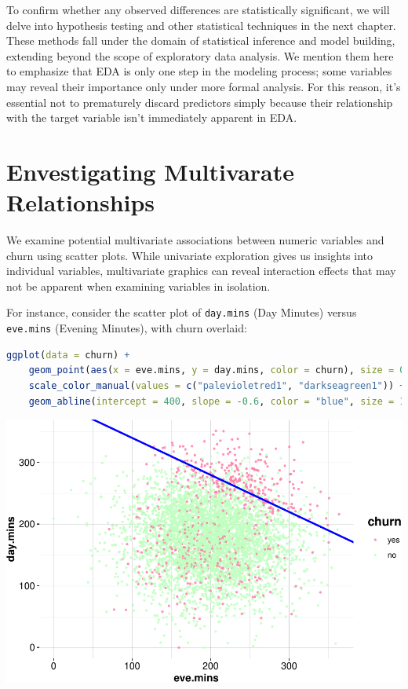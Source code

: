 \documentclass[
]{book}
\newcommand{\passthrough}[1]{#1}
\theoremstyle{definition}
\theoremstyle{definition}
\theoremstyle{definition}
\theoremstyle{definition}
\theoremstyle{remark}
\begin{document}
To confirm whether any observed differences are statistically significant, we will delve into hypothesis testing and other statistical techniques in the next chapter. These methods fall under the domain of statistical inference and model building, extending beyond the scope of exploratory data analysis. We mention them here to emphasize that EDA is only one step in the modeling process; some variables may reveal their importance only under more formal analysis. For this reason, it's essential not to prematurely discard predictors simply because their relationship with the target variable isn't immediately apparent in EDA.

\section{Envestigating Multivarate Relationships}\label{envestigating-multivarate-relationships}

We examine potential multivariate associations between numeric variables and churn using scatter plots. While univariate exploration gives us insights into individual variables, multivariate graphics can reveal interaction effects that may not be apparent when examining variables in isolation.

For instance, consider the scatter plot of \passthrough{\lstinline!day.mins!} (Day Minutes) versus \passthrough{\lstinline!eve.mins!} (Evening Minutes), with churn overlaid:

\begin{lstlisting}[language=R]
ggplot(data = churn) +
    geom_point(aes(x = eve.mins, y = day.mins, color = churn), size = 0.7, alpha = 0.8) +
    scale_color_manual(values = c("palevioletred1", "darkseagreen1")) +
    geom_abline(intercept = 400, slope = -0.6, color = "blue", size = 1)
\end{lstlisting}

\begin{center}\includegraphics{EDA_files/figure-latex/unnamed-chunk-15-1} \end{center}
\end{document}
